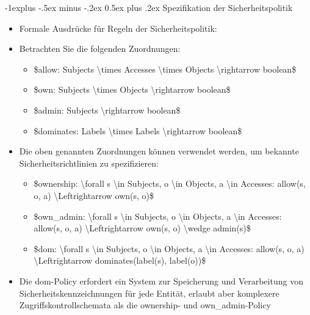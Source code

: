 \documentclass[a4paper]{article}
\makeatletter
\renewcommand{\subsection}{\@startsection{subsection}{2}{0mm}%
 {-1explus -.5ex minus -.2ex}%
 {0.5ex plus .2ex}%
 {\normalfont\normalsize\bfseries}}
\makeatother
\begin{document}
\begin{multicols}{3}
    \subsection{Spezifikation der
        Sicherheitspolitik}

    \begin{itemize}
        \item
              Formale Ausdrücke für Regeln der Sicherheitspolitik:
        \item
              Betrachten Sie die folgenden Zuordnungen:

              \begin{itemize}
                  \item
                        \$allow: Subjects \textbackslash times Accesses \textbackslash times
                        Objects \textbackslash rightarrow boolean\$
                  \item
                        \$own: Subjects \textbackslash times Objects
                        \textbackslash rightarrow boolean\$
                  \item
                        \$admin: Subjects \textbackslash rightarrow boolean\$
                  \item
                        \$dominates: Labels \textbackslash times Labels
                        \textbackslash rightarrow boolean\$
              \end{itemize}
        \item
              Die oben genannten Zuordnungen können verwendet werden, um bekannte
              Sicherheitsrichtlinien zu spezifizieren:

              \begin{itemize}
                  \item
                        \$ownership: \textbackslash forall s \textbackslash in Subjects, o
                        \textbackslash in Objects, a \textbackslash in Accesses: allow(s, o,
                        a) \textbackslash Leftrightarrow own(s, o)\$
                  \item
                        \$own\_admin: \textbackslash forall s \textbackslash in Subjects, o
                        \textbackslash in Objects, a \textbackslash in Accesses: allow(s, o,
                        a) \textbackslash Leftrightarrow own(s, o) \textbackslash wedge
                        admin(s)\$
                  \item
                        \$dom: \textbackslash forall s \textbackslash in Subjects, o
                        \textbackslash in Objects, a \textbackslash in Accesses: allow(s, o,
                        a) \textbackslash Leftrightarrow dominates(label(s), label(o))\$
              \end{itemize}
        \item
              Die dom-Policy erfordert ein System zur Speicherung und Verarbeitung
              von Sicherheitskennzeichnungen für jede Entität, erlaubt aber
              komplexere Zugriffskontrollschemata als die ownership- und
              own\_admin-Policy
    \end{itemize}



\end{multicols}
\end{document}
